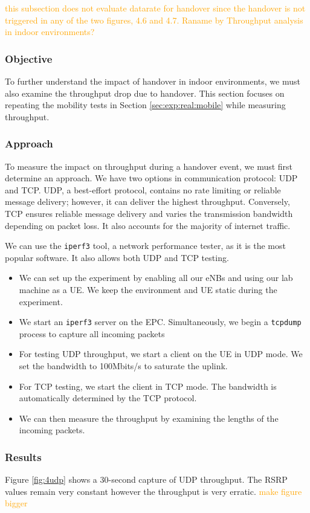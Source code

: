 \textcolor{orange}{this subsection does not evaluate datarate for handover since the handover is not triggered in any of the two figures, 4.6 and 4.7. Raname by Throughput analysis in indoor environments?}

\subsubsection{Objective}
To further understand the impact of handover in indoor environments, we must also examine the throughput drop due to handover. This section focuses on repeating the mobility tests in Section \ref{sec:exp:real:mobile} while measuring throughput.

\subsubsection{Approach}
To measure the impact on throughput during a handover event, we must first determine an approach. We have two options in communication protocol: UDP and TCP. UDP, a best-effort protocol, contains no rate limiting or reliable message delivery; however, it can deliver the highest throughput. Conversely, TCP ensures reliable message delivery and varies the transmission bandwidth depending on packet loss. It also accounts for the majority of internet traffic. 

We can use the \texttt{iperf3} tool, a network performance tester, as it is the most popular software. It also allows both UDP and TCP testing.

\begin{itemize}
    \item We can set up the experiment by enabling all our eNBs and using our lab machine as a UE. We keep the environment and UE static during the experiment.
    \item We start an \texttt{iperf3} server on the EPC. Simultaneously, we begin a \texttt{tcpdump} process to capture all incoming packets
    \item For testing UDP throughput, we start a client on the UE in UDP mode. We set the bandwidth to 100Mbits/s to saturate the uplink.
    \item For TCP testing, we start the client in TCP mode. The bandwidth is automatically determined by the TCP protocol.
    \item We can then measure the throughput by examining the lengths of the incoming packets.
\end{itemize}
\subsubsection{Results}
Figure \ref{fig:4udp} shows a 30-second capture of UDP throughput. The RSRP values remain very constant however the throughput is very erratic. \textcolor{orange}{make figure bigger}

